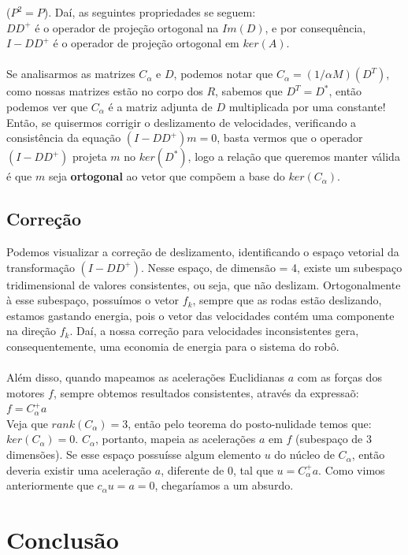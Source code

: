 \documentclass{article}
\begin{document}
($P^2 = P$). Daí, as seguintes propriedades se seguem:
\\ $DD^+$ é o operador de projeção ortogonal na $Im(D)$, e por consequência, $I - DD^+$ é o operador de projeção ortogonal em $ker(A)$.
\\ \\ \hspace{1cm} Se analisarmos as matrizes $C_{\alpha}$ e $D$, podemos notar que $C_{\alpha} = (1/{\alpha}M)(D^T)$, como nossas matrizes estão no corpo dos $R$, sabemos que $D^T = D^*$,
então podemos ver que $C_{\alpha}$ é a matriz adjunta de $D$ multiplicada por uma constante!
\\ \hspace{1cm}Então, se quisermos corrigir o deslizamento de velocidades, verificando a consistência da equação $(I-DD^+)m = 0$, basta vermos que o operador $(I - DD^+)$ projeta $m$ no $ker(D^*)$,
logo a relação que queremos manter válida é que $m$ seja \textbf{ortogonal} ao vetor que compõem a base do $ker(C_{\alpha})$.
\subsection{Correção}

\hspace{1cm}Podemos visualizar a correção de deslizamento, identificando o espaço vetorial da transformação $(I - DD^+)$.
Nesse espaço, de dimensão = 4, existe um subespaço tridimensional de valores consistentes, ou seja, que não deslizam. Ortogonalmente à esse subespaço,
possuímos o vetor $f_{k}$, sempre que as rodas estão deslizando, estamos gastando energia, pois o vetor das velocidades contém uma componente na direção $f_{k}$.
Daí, a nossa correção para velocidades inconsistentes gera, consequentemente, uma economia de energia para o sistema do robô.
\\ \\\hspace{1cm} Além disso, quando mapeamos as acelerações Euclidianas $a$ com as forças dos motores $f$, sempre obtemos resultados consistentes, através da expressaõ:
\\ $f = C_{\alpha}^+a$
\\ \hspace{1cm}Veja que $rank(C_{\alpha}) = 3$, então pelo teorema do posto-nulidade temos que: $ker(C_{\alpha}) = 0$. $C_{\alpha}$, portanto, mapeia as acelerações $a$  em $f$ (subespaço de 3 dimensões).
Se esse espaço possuísse algum elemento $u$ do núcleo de $C_{\alpha}$, então deveria existir uma aceleração $a$, diferente de 0, tal que $u = C_{\alpha}^+a$. Como vimos anteriormente que $c_ {\alpha}u = a = 0$, chegaríamos a um absurdo.

\section{Conclusão}
\end{document}
